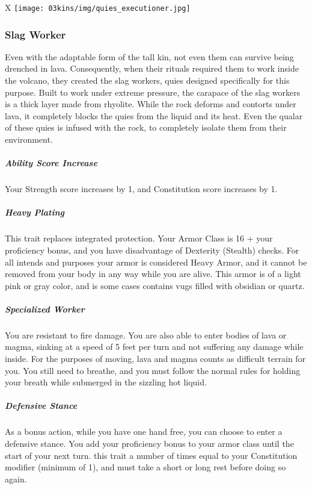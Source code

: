 \begin{linenumbers}
\begin{table*}[b]%
    \begin{DndTable}[width=\linewidth]{X}
        \texttt{[image: 03kins/img/quies\_executioner.jpg]}
    \end{DndTable}
\end{table*}

\subsubsection{Slag Worker}
Even with the adaptable form of the tall kin, not even them can survive being drenched in lava.
Consequently, when their rituals required them to work inside the volcano, they created the slag workers, quies designed specifically for this purpose.
Built to work under extreme pressure, the carapace of the slag workers is a thick layer made from rhyolite.
While the rock deforms and contorts under lava, it completely blocks the quies from the liquid and its heat.
Even the qualar of these quies is infused with the rock, to completely isolate them from their environment.
\subparagraph{Ability Score Increase} Your Strength score increases by 1, and Constitution score increases by 1.
\subparagraph{Heavy Plating} This trait replaces integrated protection.
Your Armor Class is 16 + your proficiency bonus, and you have disadvantage of Dexterity (Stealth) checks.
For all intends and purposes your armor is considered Heavy Armor, and it cannot be removed from your body in any way while you are alive.
This armor is of a light pink or gray color, and is some cases contains vugs filled with obsidian or quartz.
\subparagraph{Specialized Worker} You are resistant to fire damage.
You are also able to enter bodies of lava or magma, sinking at a speed of 5 feet per turn and not suffering any damage while inside.
For the purposes of moving, lava and magma counts as difficult terrain for you.
You still need to breathe, and you must follow the normal rules for holding your breath while submerged in the sizzling hot liquid.
\subparagraph{Defensive Stance} As a bonus action, while you have one hand free, you can choose to enter a defensive stance.
You add your proficiency bonus to your armor class until the start of your next turn.
this trait a number of times equal to your Constitution modifier (minimum of 1), and must take a short or long rest before doing so again.
\end{linenumbers}
